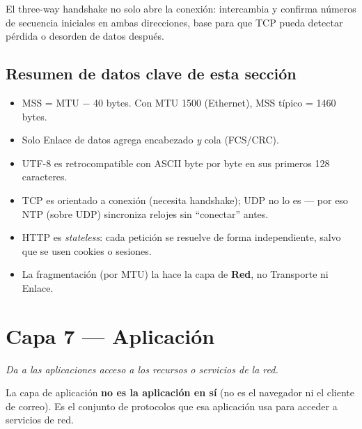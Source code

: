 \documentclass[11pt,a4paper]{article}
\begin{document}
\begin{examfact}
El three-way handshake no solo abre la conexión: intercambia y confirma números de secuencia iniciales en ambas direcciones, base para que TCP pueda detectar pérdida o desorden de datos después.
\end{examfact}

\subsection*{Resumen de datos clave de esta sección}
\begin{itemize}[leftmargin=1.4em, itemsep=2pt]
\item MSS = MTU $-$ 40 bytes. Con MTU 1500 (Ethernet), MSS típico = 1460 bytes.
\item Solo Enlace de datos agrega encabezado \emph{y} cola (FCS/CRC).
\item UTF-8 es retrocompatible con ASCII byte por byte en sus primeros 128 caracteres.
\item TCP es orientado a conexión (necesita handshake); UDP no lo es --- por eso NTP (sobre UDP) sincroniza relojes sin ``conectar'' antes.
\item HTTP es \textit{stateless}: cada petición se resuelve de forma independiente, salvo que se usen cookies o sesiones.
\item La fragmentación (por MTU) la hace la capa de \textbf{Red}, no Transporte ni Enlace.
\end{itemize}

\newpage
\section{Capa 7 --- Aplicación}
\textit{Da a las aplicaciones acceso a los recursos o servicios de la red.}

\begin{examfact}
La capa de aplicación \textbf{no es la aplicación en sí} (no es el navegador ni el cliente de correo). Es el conjunto de protocolos que esa aplicación usa para acceder a servicios de red.
\end{examfact}
\end{document}
